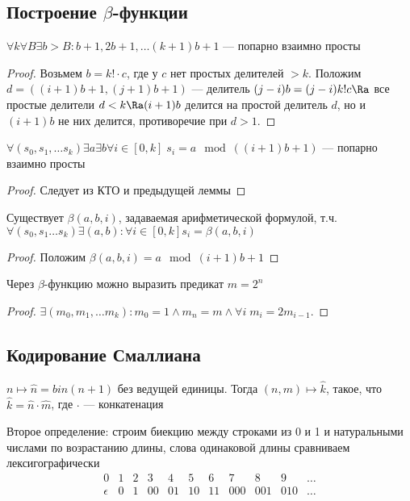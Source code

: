 \subsection{Построение \(\beta\)-функции}
\begin{lemma}
    \(\forall k \forall B \exists b > B: b + 1, 2b + 1, \dots (k + 1)b + 1\) --- попарно взаимно просты
\end{lemma}
\begin{proof}
    Возьмем \(b = k!\cdot c\), где у \(c\) нет простых делителей \(> k\). Положим \(d = ((i + 1)b + 1, (j + 1)b + 1)\) --- делитель \((j - i)b = (j - i)k!c \Ra\) все простые делители \(d < k \Ra (i + 1)b\) делится на простой делитель \(d\), но и \((i + 1)b\) не них делится, противоречие при \(d > 1\).
\end{proof}
\begin{lemma}
    \(\forall (s_0, s_1, \dots s_k) \exists a \exists b \forall i \in [0, k]\; s_i = a \mod((i + 1)b + 1)\) --- попарно взаимно просты
\end{lemma}
\begin{proof}
    Следует из КТО и предыдущей леммы
\end{proof}
\begin{theorem}
    Существует \(\beta(a, b, i)\), задаваемая арифметической формулой, т.ч. \(\forall (s_0, s_1 \dots s_k) \exists (a, b): \forall i \in [0, k] s_i = \beta(a, b, i)\)
\end{theorem}
\begin{proof}
    Положим \(\beta(a, b, i) = a \mod (i + 1)b + 1\)
\end{proof}

\begin{proposition}
    Через \(\beta\)-функцию можно выразить предикат \(m = 2^n\)
\end{proposition}
\begin{proof}
    \(\exists (m_0, m_1, \dots m_k): m_0 = 1 \wedge m_n = m \wedge \forall i\;m_i = 2m_{i - 1}\).
\end{proof}


\subsection{Кодирование Смаллиана}
\(n \mapsto \widehat{n} = bin(n + 1)\text{ без ведущей единицы}\).
Тогда \((n, m) \mapsto \widehat{k}\), такое, что \(\widehat{k} = \widehat{n}\cdot\widehat{m}\), где \(\cdot\) --- конкатенация

Второе определение: строим биекцию между строками из 0 и 1 и натуральными числами по возрастанию длины, слова одинаковой длины сравниваем лексигографически
\[\begin{array}{ccccccccccc}
    0 & 1 & 2 & 3 & 4 & 5 & 6 & 7 & 8 & 9 & \dots \\
    \epsilon & 0 & 1 & 00 & 01 & 10 & 11 & 000 & 001 & 010 & \dots
\end{array}\]


